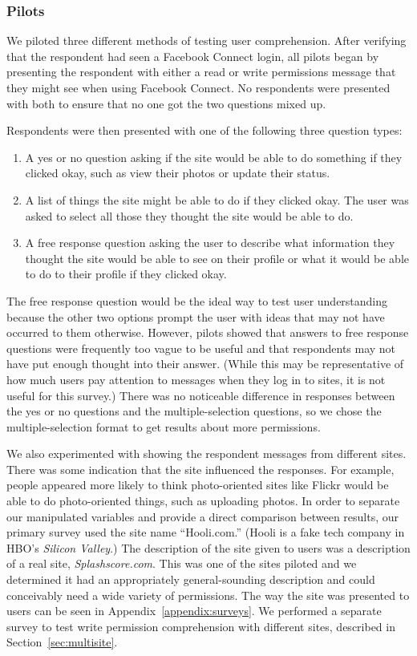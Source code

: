 \documentclass[10pt]{sig-alternate-10pt}
\begin{document}
\subsubsection{Pilots}

We piloted three different methods of testing user comprehension. After verifying that the respondent had seen a Facebook Connect login, all pilots began by presenting the respondent with either a read or write permissions message that they might see when using Facebook Connect. No respondents were presented with both to ensure that no one got the two questions mixed up.

Respondents were then presented with one of the following three question types:

\begin{enumerate}  
  \item A yes or no question asking if the site would be able to do something if they clicked okay, such as view their photos or update their status.
  \item A list of things the site might be able to do if they clicked okay. The user was asked to select all those they thought the site would be able to do.
  \item A free response question asking the user to describe what information they thought the site would be able to see on their profile or what it would be able to do to their profile if they clicked okay.
\end{enumerate}

The free response question would be the ideal way to test user understanding because the other two options prompt the user with ideas that may not have occurred to them otherwise. However, pilots showed that answers to free response questions were frequently too vague to be useful and that respondents may not have put enough thought into their answer. (While this may be representative of how much users pay attention to messages when they log in to sites, it is not useful for this survey.) There was no noticeable difference in responses between the yes or no questions and the multiple-selection questions, so we chose the multiple-selection format to get results about more permissions.

We also experimented with showing the respondent messages from different sites. There was some indication that the site influenced the responses. For example, people appeared more likely to think photo-oriented sites like Flickr would be able to do photo-oriented things, such as uploading photos. In order to separate our manipulated variables and provide a direct comparison between results, our primary survey used the site name ``Hooli.com.'' (Hooli is a fake tech company in HBO's \emph{Silicon Valley}.) The description of the site given to users was a description of a real site, \emph{Splashscore.com}. This was one of the sites piloted and we determined it had an appropriately general-sounding description and could conceivably need a wide variety of permissions. The way the site was presented to users can be seen in Appendix~\ref{appendix:surveys}. We performed a separate survey to test write permission comprehension with different sites, described in Section~\ref{sec:multisite}.
\end{document}
